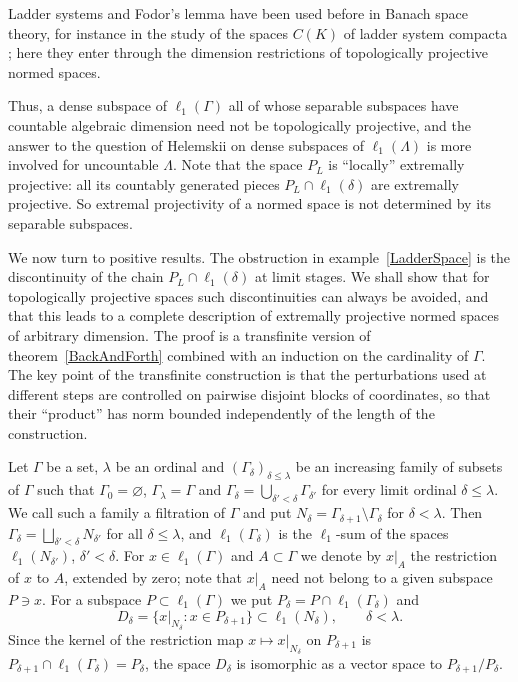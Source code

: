 \documentclass[12pt]{article}
\newcommand{\ellone}[1]{\ell_1(#1)}
\begin{document}
Ladder systems and Fodor's lemma have been used before in Banach space
theory, for instance in the study of the spaces $C(K)$ of ladder system
compacta \cite{AvilesKoszmiderLadder}; here they enter through the dimension
restrictions of topologically projective normed spaces.

Thus, a dense subspace of $\ellone{\Gamma}$ all of whose separable subspaces
have countable algebraic dimension need not be topologically projective, and
the answer to the question of Helemskii on dense subspaces of
$\ellone{\Lambda}$ is more involved for uncountable $\Lambda$. Note that the
space $P_L$ is ``locally'' extremally projective: all its countably generated
pieces $P_L\cap\ellone{\delta}$ are extremally projective. So extremal
projectivity of a normed space is not determined by its separable subspaces.

We now turn to positive results. The obstruction in example~\ref{LadderSpace}
is the discontinuity of the chain $P_L\cap\ellone{\delta}$ at limit stages.
We shall show that for topologically projective spaces such discontinuities
can always be avoided, and that this leads to a complete description of
extremally projective normed spaces of arbitrary dimension. The proof is a
transfinite version of theorem~\ref{BackAndForth} combined with an induction
on the cardinality of $\Gamma$. The key point of the transfinite construction
is that the perturbations used at different steps are controlled on pairwise
disjoint blocks of coordinates, so that their ``product'' has norm bounded
independently of the length of the construction.

Let $\Gamma$ be a set, $\lambda$ be an ordinal and ${(\Gamma_\delta)}_{\delta\leq\lambda}$
be an increasing family of subsets of $\Gamma$ such that $\Gamma_0=\varnothing$,
$\Gamma_\lambda=\Gamma$ and $\Gamma_\delta=\bigcup_{\delta'<\delta}\Gamma_{\delta'}$
for every limit ordinal $\delta\leq\lambda$. We call such a family a
filtration of $\Gamma$ and put $N_\delta=\Gamma_{\delta+1}\setminus\Gamma_\delta$
for $\delta<\lambda$. Then $\Gamma_\delta=\bigsqcup_{\delta'<\delta}N_{\delta'}$
for all $\delta\leq\lambda$, and $\ellone{\Gamma_\delta}$ is the $\ell_1$-sum of
the spaces $\ellone{N_{\delta'}}$, $\delta'<\delta$. For $x\in\ellone{\Gamma}$
and $A\subset\Gamma$ we denote by $x|_A$ the restriction of $x$ to $A$,
extended by zero; note that $x|_A$ need not belong to a given subspace
$P\ni x$. For a subspace $P\subset\ellone{\Gamma}$ we put
$P_\delta=P\cap\ellone{\Gamma_\delta}$ and
\[
D_\delta=\{x|_{N_\delta}:x\in P_{\delta+1}\}\subset\ellone{N_\delta},
\qquad \delta<\lambda.
\]
Since the kernel of the restriction map $x\mapsto x|_{N_\delta}$ on
$P_{\delta+1}$ is $P_{\delta+1}\cap\ellone{\Gamma_\delta}=P_\delta$, the space
$D_\delta$ is isomorphic as a vector space to $P_{\delta+1}/P_\delta$.
\end{document}
